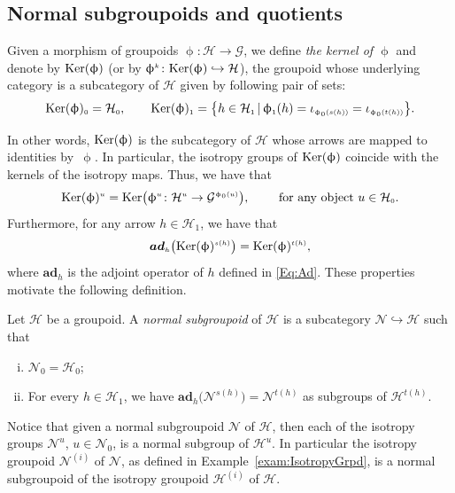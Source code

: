 \documentclass[pdftex]{sigma}
\numberwithin{equation}{section}
\newcommand{\bd}[1]{\boldsymbol{#1}}
\newcommand{\Ho}{\cH_{\Sscript{0}}}
\newcommand{\Ha}{\cH_{\Sscript{1}}}
\newcommand{\No}{\cN_{\Sscript{0}}}
\newcommand{\Ker}[1]{{\rm Ker}(#1)}
\newcommand{\Ad}[1]{{\bd{ad}}_{\Sscript{#1}}}
\newcommand{\cG}{{\mathcal G}}
\newcommand{\cH}{{\mathcal H}}
\newcommand{\cN}{{\mathcal N}}
\newcommand{\Sscript}[1]{\scriptscriptstyle{#1}}
\newcommand{\phia}{\upphi_{\Sscript{1}}}
\begin{document}
\subsection{Normal subgroupoids and quotients}\label{ssec:normal}
Given a morphism of groupoids $\upphi\colon \cH \to \cG$, we define \emph{the kernel of $\upphi$} and denote by $\Ker{\upphi}$ (or by $\upphi^{\Sscript{k}}\colon \Ker{\upphi} \hookrightarrow \cH$), the groupoid whose underlying category is a subcategory of $\cH$ given by following pair of sets:
\begin{gather*}
\Ker{\upphi}_{\Sscript{0}}=\Ho,\qquad \Ker{\upphi}_{\Sscript{1}}=\big\{ h \in \Ha\,|\, \phia(h)=\iota_{\Sscript{ \upphi_0( s(h))}}= \iota_{\Sscript{\upphi_0( t(h))}}\big\}.
\end{gather*}

In other words, $\Ker{\upphi}$ is the subcategory of $\cH$ whose arrows are mapped to identities by~$\upphi$. In particular, the isotropy groups of $\Ker{\upphi}$ coincide with the kernels of the isotropy maps. Thus, we have that
\begin{gather*}
\Ker{\upphi}^{\Sscript{u}}= {\rm Ker}\big(\upphi^{\Sscript{u}}\colon \cH^{\Sscript{u}} \to \cG^{\Sscript{\upphi_{\Sscript{0}}(u)}} \big),\qquad \text{ for any object } u \in \Ho.
\end{gather*}
Furthermore, for any arrow $h \in \Ha$, we have that
\begin{gather*}
\Ad{h}\big( \Ker{\upphi}^{\Sscript{s(h)}} \big) = \Ker{\upphi}^{\Sscript{t(h)}},
\end{gather*}
where $\Ad{h}$ is the adjoint operator of $h$ defined in \eqref{Eq:Ad}. These properties motivate the following definition.
\begin{Definition}\label{def:Normal}Let $\cH$ be a groupoid. A \emph{normal subgroupoid} of $\cH$ is a subcategory $\cN \hookrightarrow \cH$ such that
\begin{enumerate}[(i)]
\item $\cN_{\Sscript{0}} =\cH_{\Sscript{0}}$;
\item For every $h \in \Ha$, we have $\Ad{h}\big(\cN^{\Sscript{s(h)}}\big) = \cN^{\Sscript{t(h)}} $ as subgroups of $\cH^{\Sscript{t(h)}}$.
\end{enumerate}
\end{Definition}
Notice that given a normal subgroupoid $\cN$ of $\cH$, then each of the isotropy groups $\cN^{\Sscript{u}}$, $u \in \No$, is a normal subgroup of $\cH^{\Sscript{u}}$. In particular the isotropy groupoid $\cN^{\Sscript{(i)}}$ of $\cN$, as defined in Example~\ref{exam:IsotropyGrpd}, is a normal subgroupoid of the isotropy groupoid $\cH^{\Sscript{(i)}}$ of $\cH$.
\end{document}
